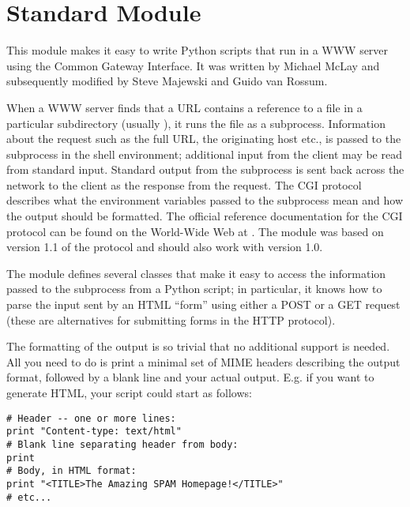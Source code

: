\section{Standard Module }

\renewcommand{\indexsubitem}{(in module cgi)}

This module makes it easy to write Python scripts that run in a WWW
server using the Common Gateway Interface.  It was written by Michael
McLay and subsequently modified by Steve Majewski and Guido van
Rossum.

When a WWW server finds that a URL contains a reference to a file in a
particular subdirectory (usually ), it runs the file as
a subprocess.  Information about the request such as the full URL, the
originating host etc., is passed to the subprocess in the shell
environment; additional input from the client may be read from
standard input.  Standard output from the subprocess is sent back
across the network to the client as the response from the request.
The CGI protocol describes what the environment variables passed to
the subprocess mean and how the output should be formatted.  The
official reference documentation for the CGI protocol can be found on
the World-Wide Web at
.  The
 module was based on version 1.1 of the protocol and should
also work with version 1.0.

The  module defines several classes that make it easy to
access the information passed to the subprocess from a Python script;
in particular, it knows how to parse the input sent by an HTML
``form'' using either a POST or a GET request (these are alternatives
for submitting forms in the HTTP protocol).

The formatting of the output is so trivial that no additional support
is needed.  All you need to do is print a minimal set of MIME headers
describing the output format, followed by a blank line and your actual
output.  E.g. if you want to generate HTML, your script could start as
follows:

\begin{verbatim}
# Header -- one or more lines:
print "Content-type: text/html"
# Blank line separating header from body:
print
# Body, in HTML format:
print "<TITLE>The Amazing SPAM Homepage!</TITLE>"
# etc...
\end{verbatim}

